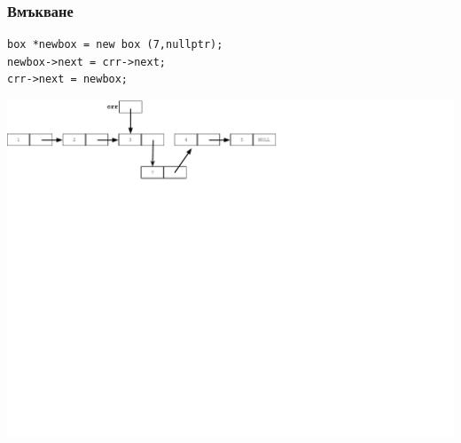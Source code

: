 \documentclass{beamer}
\begin{document}
\begin{frame}[fragile]
\frametitle{Вмъкване}

\begin{flushleft}
\begin{lstlisting}
box *newbox = new box (7,nullptr);
newbox->next = crr->next;
crr->next = newbox;
\end{lstlisting}  
\end{flushleft}


\includegraphics[width=14.0cm]{images/05_ll_insert_secondlink}

\end{frame}
\end{document}

